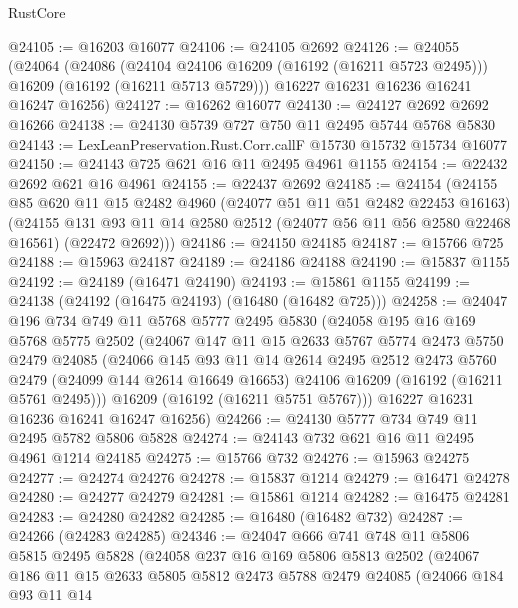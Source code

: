 \begin{lexlean}{RustCore}
\begin{coremodule}
@24105 := @16203 @16077
@24106 := @24105 @2692
@24126 := @24055
    (@24064
      (@24086
        (@24104 @24106 @16209 (@16192 (@16211 @5723 @2495)))
        @16209
        (@16192 (@16211 @5713 @5729)))
      @16227
      @16231
      @16236
      @16241
      @16247
      @16256)
@24127 := @16262 @16077
@24130 := @24127 @2692 @2692 @16266
@24138 := @24130 @5739 @727 @750 @11 @2495 @5744 @5768 @5830
@24143 := LexLeanPreservation.Rust.Corr.callF @15730 @15732 @15734 @16077
@24150 := @24143 @725 @621 @16 @11 @2495 @4961 @1155
@24154 := @22432 @2692 @621 @16 @4961
@24155 := @22437 @2692
@24185 := @24154
    (@24155
      @85
      @620
      @11
      @15
      @2482
      @4960
      (@24077 @51 @11 @51 @2482 @22453 @16163)
      (@24155 @131 @93 @11 @14 @2580 @2512 (@24077 @56 @11 @56 @2580 @22468 @16561) (@22472 @2692)))
@24186 := @24150 @24185
@24187 := @15766 @725
@24188 := @15963 @24187
@24189 := @24186 @24188
@24190 := @15837 @1155
@24192 := @24189 (@16471 @24190)
@24193 := @15861 @1155
@24199 := @24138 (@24192 (@16475 @24193) (@16480 (@16482 @725)))
@24258 := @24047
    @196
    @734
    @749
    @11
    @5768
    @5777
    @2495
    @5830
    (@24058
      @195
      @16
      @169
      @5768
      @5775
      @2502
      (@24067
        @147
        @11
        @15
        @2633
        @5767
        @5774
        @2473
        @5750
        @2479
        @24085
        (@24066
          @145
          @93
          @11
          @14
          @2614
          @2495
          @2512
          @2473
          @5760
          @2479
          (@24099 @144 @2614 @16649 @16653)
          @24106
          @16209
          (@16192 (@16211 @5761 @2495)))
        @16209
        (@16192 (@16211 @5751 @5767)))
      @16227
      @16231
      @16236
      @16241
      @16247
      @16256)
@24266 := @24130 @5777 @734 @749 @11 @2495 @5782 @5806 @5828
@24274 := @24143 @732 @621 @16 @11 @2495 @4961 @1214 @24185
@24275 := @15766 @732
@24276 := @15963 @24275
@24277 := @24274 @24276
@24278 := @15837 @1214
@24279 := @16471 @24278
@24280 := @24277 @24279
@24281 := @15861 @1214
@24282 := @16475 @24281
@24283 := @24280 @24282
@24285 := @16480 (@16482 @732)
@24287 := @24266 (@24283 @24285)
@24346 := @24047
    @666
    @741
    @748
    @11
    @5806
    @5815
    @2495
    @5828
    (@24058
      @237
      @16
      @169
      @5806
      @5813
      @2502
      (@24067
        @186
        @11
        @15
        @2633
        @5805
        @5812
        @2473
        @5788
        @2479
        @24085
        (@24066
          @184
          @93
          @11
          @14

\end{coremodule}
\end{lexlean}
